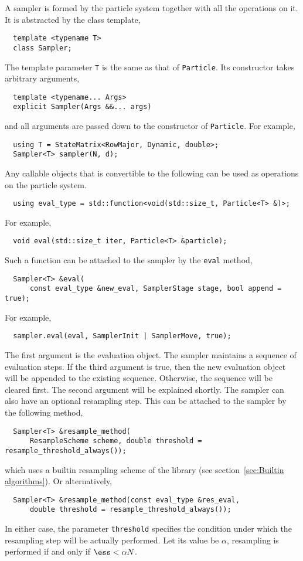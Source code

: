 A sampler is formed by the particle system together with all the operations on
it. It is abstracted by the class template,
\begin{Verbatim}
  template <typename T>
  class Sampler;
\end{Verbatim}
The template parameter \verb|T| is the same as that of \verb|Particle|. Its
constructor takes arbitrary arguments,
\begin{Verbatim}
  template <typename... Args>
  explicit Sampler(Args &&... args)
\end{Verbatim}
and all arguments are passed down to the constructor of \verb|Particle|. For
example,
\begin{Verbatim}
  using T = StateMatrix<RowMajor, Dynamic, double>;
  Sampler<T> sampler(N, d);
\end{Verbatim}
Any callable objects that is convertible to the following can be used as
operations on the particle system.
\begin{Verbatim}
  using eval_type = std::function<void(std::size_t, Particle<T> &)>;
\end{Verbatim}
For example,
\begin{Verbatim}
  void eval(std::size_t iter, Particle<T> &particle);
\end{Verbatim}
Such a function can be attached to the sampler by the \verb|eval| method,
\begin{Verbatim}
  Sampler<T> &eval(
      const eval_type &new_eval, SamplerStage stage, bool append = true);
\end{Verbatim}
For example,
\begin{Verbatim}
  sampler.eval(eval, SamplerInit | SamplerMove, true);
\end{Verbatim}
The first argument is the evaluation object. The sampler maintains a sequence
of evaluation steps. If the third argument is true, then the new evaluation
object will be appended to the existing sequence. Otherwise, the sequence will
be cleared first. The second argument will be explained shortly. The sampler
can also have an optional resampling step. This can be attached to the sampler
by the following method,
\begin{Verbatim}
  Sampler<T> &resample_method(
      ResampleScheme scheme, double threshold = resample_threshold_always());
\end{Verbatim}
which uses a builtin resampling scheme of the library (see
section~\ref{sec:Builtin algorithms}). Or alternatively,
\begin{Verbatim}
  Sampler<T> &resample_method(const eval_type &res_eval,
      double threshold = resample_threshold_always());
\end{Verbatim}
In either case, the parameter \verb|threshold| specifies the condition under
which the resampling step will be actually performed. Let its value be
$\alpha$, resampling is performed if and only if $\ess < \alpha N$.

